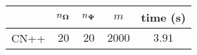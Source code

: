 \centering
\renewcommand{\arraystretch}{1.2}
\begin{tabular}{@{}lcccc@{}}
\toprule
 & $n_{\boldsymbol{\Omega}}$ & $n_{\boldsymbol{\Psi}}$ & $m$ & time (s)\\
\midrule
CN++ & $20$ & $20$ & $2000$ & $3.91$ \\
\bottomrule
\end{tabular}
